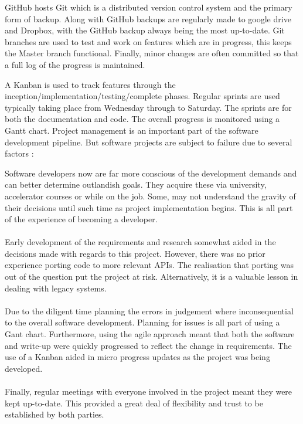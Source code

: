   GitHub hosts Git which is a distributed version control system and the primary form of backup. Along with GitHub backups are regularly made to google drive and Dropbox, with the GitHub backup always being the most up-to-date. Git branches are used to test and work on features which are in progress, this keeps the Master branch functional. Finally, minor changes are often committed so that a full log of the progress is maintained.

  A Kanban is used to track features through the inception/implementation/testing/complete phases. Regular sprints are used typically taking place from Wednesday through to Saturday. The sprints are for both the documentation and code. The overall progress is monitored using a Gantt chart.
  Project management is an important part of the software development pipeline. But software projects are subject to failure due to several factors \cite{software_failure}:

  Software developers now are far more conscious of the development demands and can better determine outlandish goals. They acquire these via university, accelerator courses or while on the job. Some, may not understand the gravity of their decisions until such time as project implementation begins. This is all part of the experience of becoming a developer.\\\\
  Early development of the requirements and research somewhat aided in the decisions made with regards to this project. However, there was no prior experience porting code to more relevant APIs. The realisation that porting was out of the question put the project at risk. Alternatively, it is a valuable lesson in dealing with legacy systems.\\\\
  Due to the diligent time planning the errors in judgement where inconsequential to the overall software development. Planning for issues is all part of using a Gant chart. Furthermore, using the agile approach meant that both the software and write-up were quickly progressed to reflect the change in requirements. The use of a Kanban aided in micro progress updates as the project was being developed.\\\\
  Finally, regular meetings with everyone involved in the project meant they were kept up-to-date. This provided a great deal of flexibility and trust to be established by both parties.


